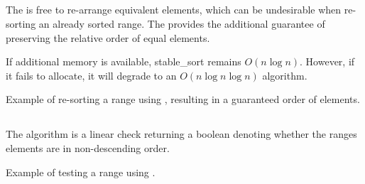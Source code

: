 \subsection{\texorpdfstring{}{\texttt{std::stable\_sort}}}

The  is free to re-arrange equivalent elements, which can be undesirable when re-sorting an already sorted range. The  provides the additional guarantee of preserving the relative order of equal elements.


If additional memory is available, stable\_sort remains $O(n\log n)$. However, if it fails to allocate, it will degrade to an $O(n\log n\log n)$ algorithm.

\begin{codebox}[]{\href{https://compiler-explorer.com/z/TKx8qP8bK}{\ExternalLink}}
\footnotesize Example of re-sorting a range using , resulting in a guaranteed order of elements.
\tcblower
{}
\end{codebox}

\subsection{\texorpdfstring{}{\texttt{std::is\_sorted}}}

The  algorithm is a linear check returning a boolean denoting whether the ranges elements are in non-descending order.


\begin{codebox}[]{\href{https://compiler-explorer.com/z/T3n9bfqdM}{\ExternalLink}}
\footnotesize Example of testing a range using .
\tcblower
{}
\end{codebox}

\subsection{\texorpdfstring{}{\texttt{std::is\_sorted\_until}}}

